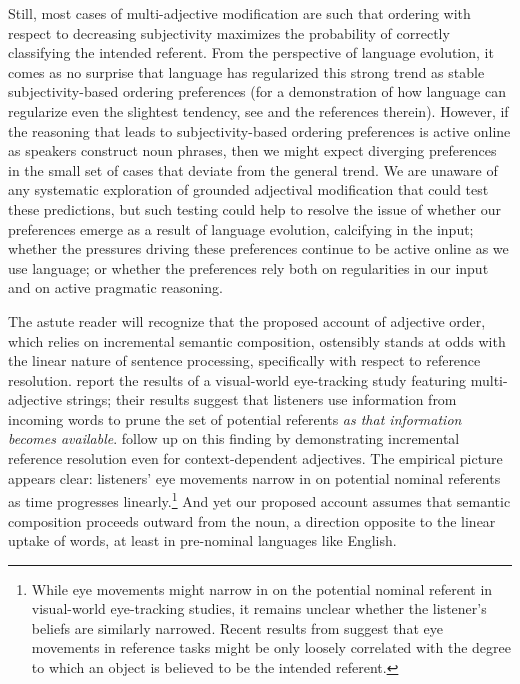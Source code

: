 \documentclass{sp}
\newcommand{\jd}[1]{\textcolor{Blue}{[jd: #1]}}
\newcommand{\gcs}[1]{\textcolor{blue}{[gcs: #1]}}
\begin{document}
Still, most cases of multi-adjective modification are such that ordering with respect to decreasing subjectivity maximizes the probability of correctly classifying the intended referent. From the perspective of language evolution, it comes as no surprise that language has regularized this strong trend as stable subjectivity-based ordering preferences (for a demonstration of how language can regularize even the slightest tendency, see \citealp{kirby2017} and the references therein). However, if the reasoning that leads to subjectivity-based ordering preferences is active online as speakers construct noun phrases, then we might expect diverging preferences in the small set of cases that deviate from the general trend. We are unaware of any systematic exploration of grounded adjectival modification that could test these predictions, but such testing could help to resolve the issue of whether our preferences emerge as a result of language evolution, calcifying in the input; whether the pressures driving these preferences continue to be active online as we use language; or whether the preferences rely both on regularities in our input and on active pragmatic reasoning.
 

The astute reader will recognize that the proposed account of adjective order, which relies on incremental semantic composition, ostensibly stands at odds with the linear nature of sentence processing, specifically with respect to reference resolution. \cite{eberhardetal1995} report the results of a visual-world eye-tracking study featuring multi-adjective strings; their results suggest that listeners use information from incoming words to prune the set of potential referents \emph{as that information becomes available}. \cite{sedivyetal1999} follow up on this finding by demonstrating incremental reference resolution even for context-dependent adjectives. The empirical picture appears clear: listeners' eye movements narrow in on potential nominal referents as time progresses linearly.\footnote{While eye movements might narrow in on the potential nominal referent in visual-world eye-tracking studies, it remains unclear whether the listener's beliefs are similarly narrowed. Recent results from \cite{qingetal2018} suggest that eye movements in reference tasks might be only loosely correlated with the degree to which an object is believed to be the intended referent. %
} 
And yet our proposed account assumes that semantic composition proceeds outward from the noun, a direction opposite to the linear uptake of words, at least in pre-nominal languages like English.
\end{document}

